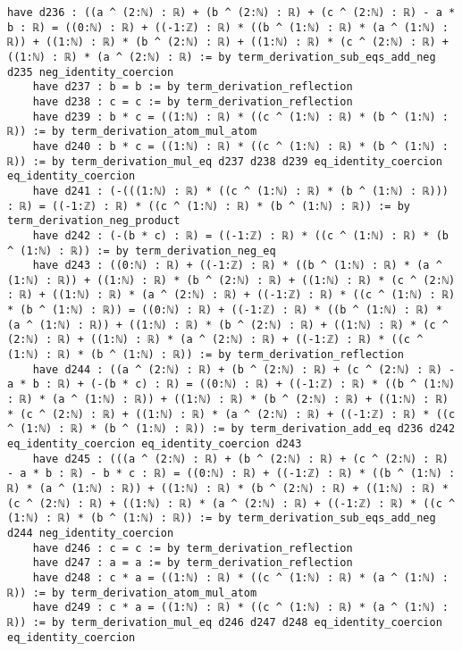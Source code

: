 \documentclass{article}
\begin{document}
\begin{tcolorbox}[colback=white!10, width=\linewidth]
\begin{lstlisting}[language=Lean4]
    have d236 : ((a ^ (2:ℕ) : ℝ) + (b ^ (2:ℕ) : ℝ) + (c ^ (2:ℕ) : ℝ) - a * b : ℝ) = ((0:ℕ) : ℝ) + ((-1:ℤ) : ℝ) * ((b ^ (1:ℕ) : ℝ) * (a ^ (1:ℕ) : ℝ)) + ((1:ℕ) : ℝ) * (b ^ (2:ℕ) : ℝ) + ((1:ℕ) : ℝ) * (c ^ (2:ℕ) : ℝ) + ((1:ℕ) : ℝ) * (a ^ (2:ℕ) : ℝ) := by term_derivation_sub_eqs_add_neg d235 neg_identity_coercion
    have d237 : b = b := by term_derivation_reflection
    have d238 : c = c := by term_derivation_reflection
    have d239 : b * c = ((1:ℕ) : ℝ) * ((c ^ (1:ℕ) : ℝ) * (b ^ (1:ℕ) : ℝ)) := by term_derivation_atom_mul_atom
    have d240 : b * c = ((1:ℕ) : ℝ) * ((c ^ (1:ℕ) : ℝ) * (b ^ (1:ℕ) : ℝ)) := by term_derivation_mul_eq d237 d238 d239 eq_identity_coercion eq_identity_coercion
    have d241 : (-(((1:ℕ) : ℝ) * ((c ^ (1:ℕ) : ℝ) * (b ^ (1:ℕ) : ℝ))) : ℝ) = ((-1:ℤ) : ℝ) * ((c ^ (1:ℕ) : ℝ) * (b ^ (1:ℕ) : ℝ)) := by term_derivation_neg_product
    have d242 : (-(b * c) : ℝ) = ((-1:ℤ) : ℝ) * ((c ^ (1:ℕ) : ℝ) * (b ^ (1:ℕ) : ℝ)) := by term_derivation_neg_eq
    have d243 : ((0:ℕ) : ℝ) + ((-1:ℤ) : ℝ) * ((b ^ (1:ℕ) : ℝ) * (a ^ (1:ℕ) : ℝ)) + ((1:ℕ) : ℝ) * (b ^ (2:ℕ) : ℝ) + ((1:ℕ) : ℝ) * (c ^ (2:ℕ) : ℝ) + ((1:ℕ) : ℝ) * (a ^ (2:ℕ) : ℝ) + ((-1:ℤ) : ℝ) * ((c ^ (1:ℕ) : ℝ) * (b ^ (1:ℕ) : ℝ)) = ((0:ℕ) : ℝ) + ((-1:ℤ) : ℝ) * ((b ^ (1:ℕ) : ℝ) * (a ^ (1:ℕ) : ℝ)) + ((1:ℕ) : ℝ) * (b ^ (2:ℕ) : ℝ) + ((1:ℕ) : ℝ) * (c ^ (2:ℕ) : ℝ) + ((1:ℕ) : ℝ) * (a ^ (2:ℕ) : ℝ) + ((-1:ℤ) : ℝ) * ((c ^ (1:ℕ) : ℝ) * (b ^ (1:ℕ) : ℝ)) := by term_derivation_reflection
    have d244 : ((a ^ (2:ℕ) : ℝ) + (b ^ (2:ℕ) : ℝ) + (c ^ (2:ℕ) : ℝ) - a * b : ℝ) + (-(b * c) : ℝ) = ((0:ℕ) : ℝ) + ((-1:ℤ) : ℝ) * ((b ^ (1:ℕ) : ℝ) * (a ^ (1:ℕ) : ℝ)) + ((1:ℕ) : ℝ) * (b ^ (2:ℕ) : ℝ) + ((1:ℕ) : ℝ) * (c ^ (2:ℕ) : ℝ) + ((1:ℕ) : ℝ) * (a ^ (2:ℕ) : ℝ) + ((-1:ℤ) : ℝ) * ((c ^ (1:ℕ) : ℝ) * (b ^ (1:ℕ) : ℝ)) := by term_derivation_add_eq d236 d242 eq_identity_coercion eq_identity_coercion d243
    have d245 : (((a ^ (2:ℕ) : ℝ) + (b ^ (2:ℕ) : ℝ) + (c ^ (2:ℕ) : ℝ) - a * b : ℝ) - b * c : ℝ) = ((0:ℕ) : ℝ) + ((-1:ℤ) : ℝ) * ((b ^ (1:ℕ) : ℝ) * (a ^ (1:ℕ) : ℝ)) + ((1:ℕ) : ℝ) * (b ^ (2:ℕ) : ℝ) + ((1:ℕ) : ℝ) * (c ^ (2:ℕ) : ℝ) + ((1:ℕ) : ℝ) * (a ^ (2:ℕ) : ℝ) + ((-1:ℤ) : ℝ) * ((c ^ (1:ℕ) : ℝ) * (b ^ (1:ℕ) : ℝ)) := by term_derivation_sub_eqs_add_neg d244 neg_identity_coercion
    have d246 : c = c := by term_derivation_reflection
    have d247 : a = a := by term_derivation_reflection
    have d248 : c * a = ((1:ℕ) : ℝ) * ((c ^ (1:ℕ) : ℝ) * (a ^ (1:ℕ) : ℝ)) := by term_derivation_atom_mul_atom
    have d249 : c * a = ((1:ℕ) : ℝ) * ((c ^ (1:ℕ) : ℝ) * (a ^ (1:ℕ) : ℝ)) := by term_derivation_mul_eq d246 d247 d248 eq_identity_coercion eq_identity_coercion

\end{lstlisting}
\end{tcolorbox}
\end{document}
